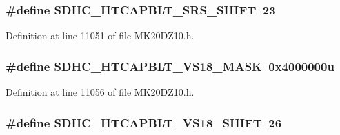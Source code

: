 \subsubsection[{\texorpdfstring{S\+D\+H\+C\+\_\+\+H\+T\+C\+A\+P\+B\+L\+T\+\_\+\+S\+R\+S\+\_\+\+S\+H\+I\+FT}{SDHC_HTCAPBLT_SRS_SHIFT}}]{\setlength{\rightskip}{0pt plus 5cm}\#define S\+D\+H\+C\+\_\+\+H\+T\+C\+A\+P\+B\+L\+T\+\_\+\+S\+R\+S\+\_\+\+S\+H\+I\+FT~23}\hypertarget{group___s_d_h_c___register___masks_ga47c009f4b74a67296231bb73fa1c74f8}{}\label{group___s_d_h_c___register___masks_ga47c009f4b74a67296231bb73fa1c74f8}


Definition at line 11051 of file M\+K20\+D\+Z10.\+h.

\subsubsection[{\texorpdfstring{S\+D\+H\+C\+\_\+\+H\+T\+C\+A\+P\+B\+L\+T\+\_\+\+V\+S18\+\_\+\+M\+A\+SK}{SDHC_HTCAPBLT_VS18_MASK}}]{\setlength{\rightskip}{0pt plus 5cm}\#define S\+D\+H\+C\+\_\+\+H\+T\+C\+A\+P\+B\+L\+T\+\_\+\+V\+S18\+\_\+\+M\+A\+SK~0x4000000u}\hypertarget{group___s_d_h_c___register___masks_ga5677e346e2d7f65fbaf2615a331f3438}{}\label{group___s_d_h_c___register___masks_ga5677e346e2d7f65fbaf2615a331f3438}


Definition at line 11056 of file M\+K20\+D\+Z10.\+h.

\subsubsection[{\texorpdfstring{S\+D\+H\+C\+\_\+\+H\+T\+C\+A\+P\+B\+L\+T\+\_\+\+V\+S18\+\_\+\+S\+H\+I\+FT}{SDHC_HTCAPBLT_VS18_SHIFT}}]{\setlength{\rightskip}{0pt plus 5cm}\#define S\+D\+H\+C\+\_\+\+H\+T\+C\+A\+P\+B\+L\+T\+\_\+\+V\+S18\+\_\+\+S\+H\+I\+FT~26}\hypertarget{group___s_d_h_c___register___masks_gaa162e0efb46d0271d898b43e7707e8e0}{}\label{group___s_d_h_c___register___masks_gaa162e0efb46d0271d898b43e7707e8e0}


